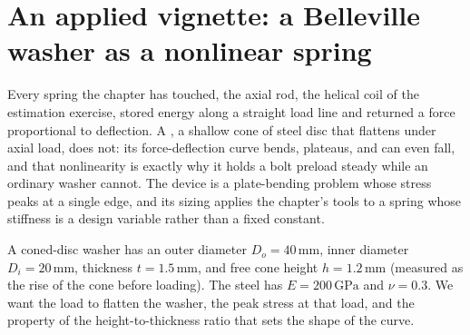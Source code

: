\section{An applied vignette: a Belleville washer as a
nonlinear spring}

Every spring the chapter has touched, the axial rod, the helical coil of
the estimation exercise, stored energy along a straight load line and
returned a force proportional to deflection. A , a shallow cone of steel disc that flattens under axial load, does
not: its force-deflection curve bends, plateaus, and can even fall, and
that nonlinearity is exactly why it holds a bolt preload steady while an
ordinary washer cannot. The device is a plate-bending problem whose stress
peaks at a single edge, and its sizing applies the chapter's tools to a
spring whose stiffness is a design variable rather than a fixed constant.

A coned-disc washer has an outer diameter $D_o = 40\,\si{\milli\meter}$,
inner diameter $D_i = 20\,\si{\milli\meter}$, thickness $t = 1.5\,\si{
\milli\meter}$, and free cone height $h = 1.2\,\si{\milli\meter}$
(measured as the rise of the cone before loading). The steel has $E =
200\,\text{GPa}$ and $\nu = 0.3$. We want the load to flatten the washer,
the peak stress at that load, and the property of the height-to-thickness
ratio that sets the shape of the curve.

